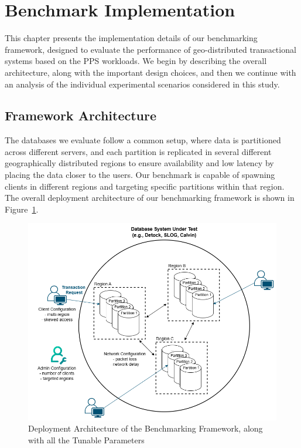 \section{Benchmark Implementation}
\label{sec: benchmark-implementation}
This chapter presents the implementation details of our benchmarking framework, designed to evaluate the performance of geo-distributed transactional systems based on the PPS workloads. We begin by describing the overall architecture, along with the important design choices, and then we continue with an analysis of the individual experimental scenarios considered in this study.

\subsection{Framework Architecture}
The databases we evaluate follow a common setup, where data is partitioned across different servers, and each partition is replicated in several different geographically distributed regions to ensure availability and low latency by placing the data closer to the users. Our benchmark is capable of spawning clients in different regions and targeting specific partitions within that region. The overall deployment architecture of our benchmarking framework is shown in Figure~\ref{fig: deployment-architecture}.

\begin{figure}[ht]
    \centering
    \includegraphics[width=1\linewidth]{figures/Deployment Architecture.png}
    \caption{Deployment Architecture of the Benchmarking Framework, along with all the Tunable Parameters}
    \label{fig: deployment-architecture}
\end{figure}

